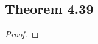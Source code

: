\documentclass[../../main.tex]{subfiles}
\begin{document}
\subsection{Theorem 4.39}
\begin{wts}

\end{wts}
\begin{proof}

\end{proof}
\end{document}
